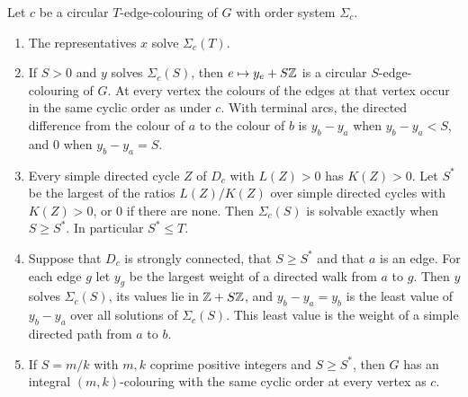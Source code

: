 \documentclass[11pt,colorlinks]{charlie}
\begin{document}
\begin{lemma}\label{lem:order}
Let $c$ be a circular $T$-edge-colouring of $G$ with order system $\Sigma_c$.
\begin{enumerate}
\item\label{it:sol} The representatives $x$ solve $\Sigma_c(T)$.
\item\label{it:colour} If $S>0$ and $y$ solves $\Sigma_c(S)$, then $e\mapsto y_e+S\mathbb{Z}$ is a circular $S$-edge-colouring of $G$. At every vertex the colours of the edges at that vertex occur in the same cyclic order as under $c$. With terminal arcs, the directed difference from the colour of $a$ to the colour of $b$ is $y_b-y_a$ when $y_b-y_a<S$, and $0$ when $y_b-y_a=S$.
\item\label{it:threshold} Every simple directed cycle $Z$ of $D_c$ with $L(Z)>0$ has $K(Z)>0$. Let $S^*$ be the largest of the ratios $L(Z)/K(Z)$ over simple directed cycles with $K(Z)>0$, or $0$ if there are none. Then $\Sigma_c(S)$ is solvable exactly when $S\ge S^*$. In particular $S^*\le T$.
\item\label{it:potential} Suppose that $D_c$ is strongly connected, that $S\ge S^*$ and that $a$ is an edge. For each edge $g$ let $y_g$ be the largest weight of a directed walk from $a$ to $g$. Then $y$ solves $\Sigma_c(S)$, its values lie in $\mathbb{Z}+S\mathbb{Z}$, and $y_b-y_a=y_b$ is the least value of $y_b-y_a$ over all solutions of $\Sigma_c(S)$. This least value is the weight of a simple directed path from $a$ to $b$.
\item\label{it:grid} If $S=m/k$ with $m,k$ coprime positive integers and $S\ge S^*$, then $G$ has an integral $(m,k)$-colouring with the same cyclic order at every vertex as $c$.
\end{enumerate}
\end{lemma}
\end{document}
